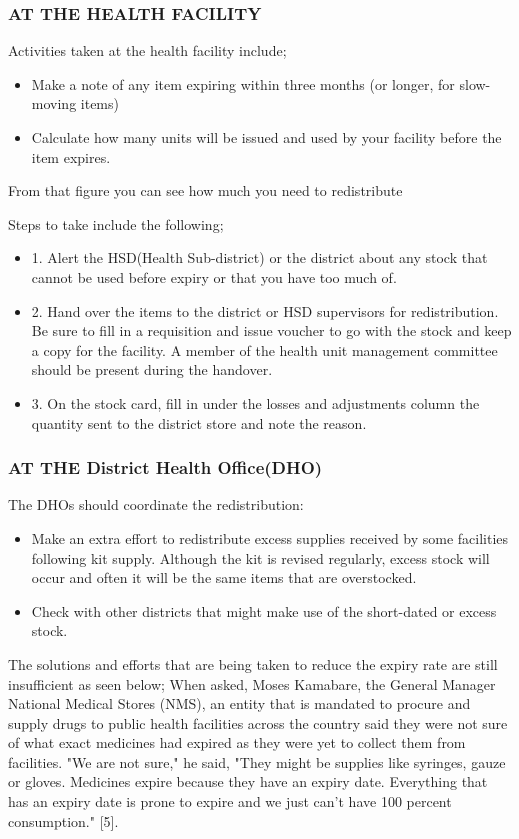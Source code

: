 \documentclass[12pt, a4paper]{report}
\begin{document}
\subsubsection*{AT THE HEALTH FACILITY}  
Activities taken at the health facility include; 
\begin{itemize}
\item Make a note of any item expiring within three months (or longer, for slow-moving items) 
\item Calculate how many units will be issued and used by your facility before the item expires. 
\end{itemize}
From that figure you can see how much you need to redistribute  

Steps to take include the following;  
\begin{itemize}
\item{1. Alert the HSD(Health Sub-district) or the district about any stock that cannot be used before expiry or that you have too much of.}
\item{ 2. Hand over the items to the district or HSD supervisors for redistribution.} 
Be sure to fill in a requisition and issue voucher to go with the stock and keep a copy for the facility. 
A member of the health unit management committee should be present during the handover. 
\item{3. On the stock card, fill in under the losses and adjustments column the quantity sent to the district store and note the reason.}  
\end{itemize}

\subsubsection*{AT THE District Health Office(DHO)}

The DHOs should coordinate the redistribution:
\begin{itemize}
\item Make an extra effort to redistribute excess supplies received by some facilities following kit supply. Although the kit is revised regularly, excess stock will occur and often it will be the same items that are overstocked.  
\item Check with other districts that might make use of the short-dated or excess stock. 
\end{itemize}

The solutions and efforts that are being taken to reduce the expiry rate are still insufficient as seen below; 
When asked, Moses Kamabare, the General Manager National Medical Stores (NMS), an entity that is mandated to procure and supply drugs to public health facilities across the country said they were not sure of what exact medicines had expired as they were yet to collect them from facilities. "We are not sure," he said, "They might be supplies like syringes, gauze or gloves. Medicines expire because they have an expiry date. Everything that has an expiry date is prone to expire and we just can't have 100 percent consumption." [5]. 
\end{document}
